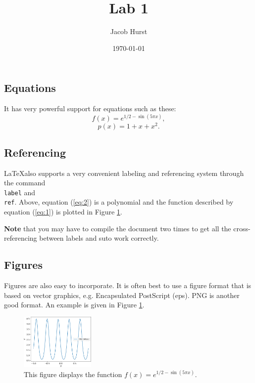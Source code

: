 \documentclass[12pt]{article}
\title{ Lab 1 }
\author{ Jacob Hurst }
\date{\today}   %
\begin{document}
\maketitle
\clearpage

\subsection{Equations}
It has very powerful support for equations such
as these:
\begin{equation}
f(x) = e^{1/2 - \sin(5 \pi    x)}, \label{eq:1} 
\end{equation}
\begin{equation}
p(x) = 1+x+x^2. \label{eq:2} 
\end{equation}

\subsection{Referencing}
\LaTeX also supports a very convenient labeling and referencing system
through the command \texttt{\\label} and \texttt{\\ref}.  Above, equation
(\ref{eq:2}) is a polynomial and the function described by equation
(\ref{eq:1}) is plotted in Figure \ref{fig:1}. 

{\bf Note} that you may have to compile the document two times to get
all the cross-referencing between labels and suto work correctly.

\subsection{Figures}
Figures are also easy to incorporate. It is often best to use a figure
format that is based on vector graphics, e.g. Encapsulated PostScript
(eps). PNG is another good format.  An example is given in Figure \ref{fig:1}. 

\begin{figure}[htb]
\begin{center}
   \includegraphics[width=0.32\textwidth]{lab1.png}
   \caption{This figure displays the function $f(x) = e^{1/2 - \sin(5 \pi x)}$.} 
   \label{fig:1}
\end{center}
\end{figure}
\end{document}
